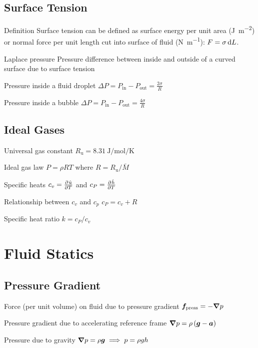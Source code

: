\documentclass{article}
\begin{document}
\subsection{Surface Tension}
\begin{description*}
\item[Definition] Surface tension can be defined as surface energy per unit area
  (\si{\joule\per\square\meter}) or normal force per unit length cut into surface of fluid
  (\si{\newton\per\meter}): \(F = \sigma \dif L\).
\item[Laplace pressure] Pressure difference between inside and outside of a curved surface due to
  surface tension
  \begin{description*}
  \item[Pressure inside a fluid droplet]
    \(\Delta P = P_\mathrm{in} -
    P_\mathrm{out} = \frac{2\sigma}{R}\)
  \item[Pressure inside a bubble] \(\Delta P = P_\mathrm{in} -
    P_\mathrm{out} = \frac{4\sigma}{R}\)
  \end{description*}
\end{description*}

\subsection{Ideal Gases}
\begin{description*}
\item[Universal gas constant]
  \(R_\mathrm{u} = \SI{8.31}{\joule\per\mole\per\kelvin}\)
\item[Ideal gas law]
  \(P = \rho R T\) where \(R = R_\mathrm{u}/\bar{M}\)
\item[Specific heats]
  \(c_v = \pd{\hat u}{T}\) and \(c_P = \pd{\hat h}{T}\)
\item[Relationship between $c_v$ and $c_p$]
  \(c_P = c_v + R\)
\item[Specific heat ratio]
  \(k = c_P/c_v\)
\end{description*}

\section{Fluid Statics}

\subsection{Pressure Gradient}
\begin{description*}
\item[Force (per unit volume) on fluid due to pressure gradient]
  \(\bm{f}_\mathrm{press} = -\bm{\nabla} p\)
\item[Pressure gradient due to accelerating reference frame]
  \(\bm{\nabla} p = \rho \left(\bm{g}-\bm{a}\right)\)
\item[Pressure due to gravity]
  \(\bm{\nabla} p = \rho \bm{g} \implies p = \rho g h\)
\end{description*}
\end{document}
